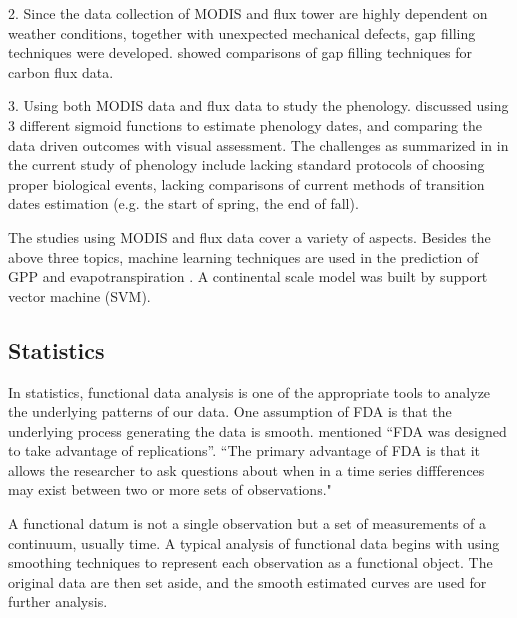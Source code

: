 \documentclass{article}\usepackage[]{graphicx}\usepackage[]{color}
\begin{document}
2. Since the data collection of MODIS and flux tower are highly dependent on weather conditions, together with unexpected mechanical defects, gap filling techniques were  developed. \citet{moffat2007comprehensive} showed comparisons of gap filling techniques for carbon flux data.

3. Using both MODIS data and flux data to study the phenology. \citet{klosterman2014evaluating} discussed using 3 different sigmoid functions to estimate phenology dates, and comparing the data driven outcomes with visual assessment.  The challenges as summarized in \citet{klosterman2014evaluating} in the current study of phenology include lacking standard protocols of choosing proper biological events, lacking comparisons of current methods of transition dates estimation (e.g. the start of spring, the end of fall).

The studies using MODIS and flux data cover a variety of aspects. Besides the above three topics, machine learning techniques are used in the prediction of GPP \citep{yang2007developing} and evapotranspiration \citep{yang2006prediction}.  A continental scale model was built by support vector machine (SVM).   

\subsection{Statistics}

In statistics, functional data analysis is one of the appropriate tools to analyze the underlying patterns of our data. 
One assumption of FDA is that the underlying process generating the data is smooth.
\citet{levitin2007introduction} mentioned ``FDA was designed to take advantage of replications''.
``The primary advantage of FDA is that it allows the researcher to ask questions about when in a time series diffferences may exist between two or more sets of observations." \citep{levitin2007introduction}

A functional datum is not a single observation but a set of measurements of a continuum, usually time.
A typical analysis of functional data begins with using smoothing techniques to represent each observation as a functional object. The original data are then set aside, and the smooth estimated curves are used for further analysis. 
\end{document}
